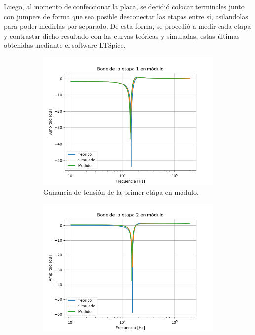 Luego, al momento de confeccionar la placa, se decidió colocar terminales junto con jumpers de forma que sea posible desconectar las etapas entre sí, asilandolas para poder medirlas por separado. De esta forma, se procedió a medir cada etapa y contrastar dicho resultado con las curvas teóricas y simuladas, estas últimas obtenidas mediante el software LTSpice.
\begin{figure}[H]
\centering
\begin{subfigure}{.49\textwidth}
\centering
	\includegraphics[width=\textwidth]{Imagenes/Mod-1.png}
	\caption{Ganancia de tensión de la primer etápa en módulo.}
	\label{fig:mod1}
\end{subfigure}
\centering
\begin{subfigure}{.49\textwidth}
\centering
	\includegraphics[width=\textwidth]{Imagenes/Mod-2.png}

\end{subfigure}
\end{figure}
